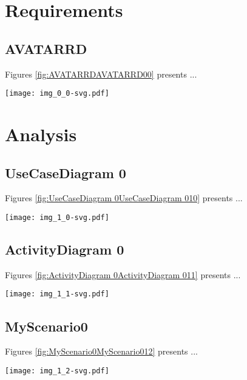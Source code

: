 
\section{Requirements}
\subsection{AVATARRD}
Figures \ref{fig:AVATARRDAVATARRD00} presents ...
\begin{figure*}[htb]
\centering
\texttt{[image: img\_0\_0-svg.pdf]}
\caption{Diagram "AVATARRD"}
\label{fig:AVATARRDAVATARRD00}
\end{figure*}

\section{Analysis}
\subsection{UseCaseDiagram 0}
Figures \ref{fig:UseCaseDiagram 0UseCaseDiagram 010} presents ...
\begin{figure*}[htb]
\centering
\texttt{[image: img\_1\_0-svg.pdf]}
\caption{Diagram "UseCaseDiagram 0"}
\label{fig:UseCaseDiagram 0UseCaseDiagram 010}
\end{figure*}

\subsection{ActivityDiagram 0}
Figures \ref{fig:ActivityDiagram 0ActivityDiagram 011} presents ...
\begin{figure*}[htb]
\centering
\texttt{[image: img\_1\_1-svg.pdf]}
\caption{Diagram "ActivityDiagram 0"}
\label{fig:ActivityDiagram 0ActivityDiagram 011}
\end{figure*}

\subsection{MyScenario0}
Figures \ref{fig:MyScenario0MyScenario012} presents ...
\begin{figure*}[htb]
\centering
\texttt{[image: img\_1\_2-svg.pdf]}
\caption{Diagram "MyScenario0"}
\label{fig:MyScenario0MyScenario012}
\end{figure*}

